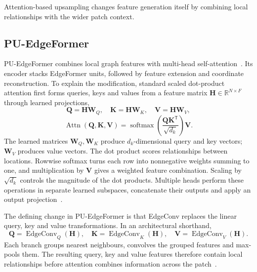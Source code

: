 Attention-based upsampling changes feature generation itself by combining
local relationships with the wider patch context.

\subsection{PU-EdgeFormer}
\label{subsec:puedgeformer}

PU-EdgeFormer combines local graph features with multi-head
self-attention~\cite{kim2023puedgeformer}. Its encoder stacks EdgeFormer
units, followed by feature extension and coordinate reconstruction. To
explain the modification, standard scaled dot-product attention first
forms queries, keys and values from a feature matrix
$\mathbf H\in\mathbb R^{N\times F}$ through learned projections,
\begin{equation}
 \mathbf Q=\mathbf H\mathbf W_Q,\quad
 \mathbf K=\mathbf H\mathbf W_K,\quad
 \mathbf V=\mathbf H\mathbf W_V,
 \label{eq:qkv}
\end{equation}
\begin{equation}
 \operatorname{Attn}(\mathbf Q,\mathbf K,\mathbf V)
 =\operatorname{softmax}\left(\frac{\mathbf Q\mathbf K^{\mathsf T}}
 {\sqrt{d_k}}\right)\mathbf V.
 \label{eq:attention}
\end{equation}
The learned matrices $\mathbf W_Q,\mathbf W_K$ produce $d_k$-dimensional
query and key vectors; $\mathbf W_V$ produces value vectors. The dot
product scores relationships between locations. Rowwise softmax turns
each row into nonnegative weights summing to one, and multiplication by
$\mathbf V$ gives a weighted feature combination. Scaling by
$\sqrt{d_k}$ controls the magnitude of the dot products. Multiple heads
perform these operations in separate learned subspaces, concatenate their
outputs and apply an output projection~\cite{vaswani2017attention}.

The defining change in PU-EdgeFormer is that EdgeConv replaces the linear
query, key and value transformations. In an architectural shorthand,
\begin{equation}
 \mathbf Q=\operatorname{EdgeConv}_Q(\mathbf H),\quad
 \mathbf K=\operatorname{EdgeConv}_K(\mathbf H),\quad
 \mathbf V=\operatorname{EdgeConv}_V(\mathbf H).
 \label{eq:edgeformer_qkv}
\end{equation}
Each branch groups nearest neighbours, convolves the grouped features and
max-pools them. The resulting query, key and value features therefore
contain local relationships before attention combines information across
the patch~\cite{kim2023puedgeformer}. 

